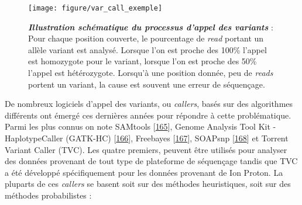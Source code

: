 \documentclass[12pt,a4paper,twoside]{ugathesis}
\theoremstyle{definition}
\theoremstyle{definition}
\theoremstyle{definition}
\theoremstyle{remark}
\begin{document}
\begin{figure}

{\centering \texttt{[image: figure/var\_call\_exemple]} 

}

\caption[Illustration schématique du processus d'appel des variants]{\textbf{\emph{Illustration schématique du
processus d'appel des variants}} : Pour chaque position couverte, le
pourcentage de \emph{read} portant un allèle variant est analysé.
Lorsque l'on est proche des 100\% l'appel est homozygote pour le
variant, lorsque l'on est proche des 50\% l'appel est hétérozygote.
Lorsqu'à une position donnée, peu de \emph{reads} portent un variant, la
cause est souvent une erreur de séquençage.}\label{fig:picvarcallprocess}
\end{figure}









De nombreux logiciels d'appel des variants, ou \emph{callers}, basés sur
des algorithmes différents ont émergé ces dernières années pour répondre
à cette problématique. Parmi les plus connus on note SAMtools
{[}\protect\hyperlink{ref-Li2009}{165}{]}, Genome Analysis Tool Kit -
HaplotypeCaller (GATK-HC)
{[}\protect\hyperlink{ref-McKenna2010}{166}{]}, Freebayes
{[}\protect\hyperlink{ref-Garrison2012}{167}{]}, SOAPsnp
{[}\protect\hyperlink{ref-Li2009c}{168}{]} et Torrent Variant Caller
(TVC). Les quatre premiers, peuvent être utilisés pour analyser des
données provenant de tout type de plateforme de séquençage tandis que
TVC a été développé spécifiquement pour les données provenant de Ion
Proton. La pluparts de ces \emph{callers} se basent soit sur des
méthodes heuristiques, soit sur des méthodes probabilistes :
\end{document}
